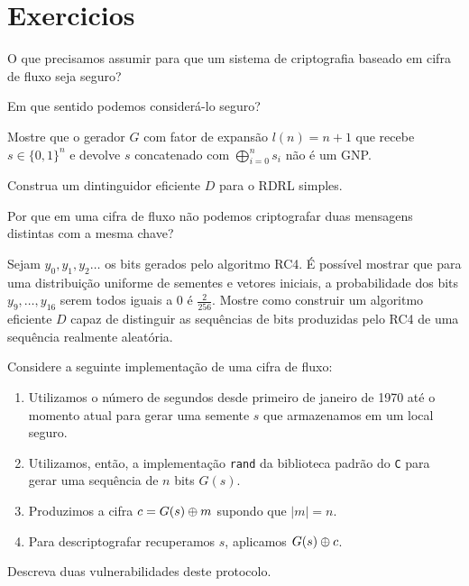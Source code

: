\section{Exercicios}
\label{sec:exercicios}

\begin{exercicio}
  O que precisamos assumir para que um sistema de criptografia baseado em cifra de fluxo seja seguro?

  Em que sentido podemos considerá-lo seguro?
\end{exercicio}

\begin{exercicio}
Mostre que o gerador $G$ com fator de expansão $l(n) = n + 1$ que recebe $s \in \{0,1\}^n$ e devolve $s$ concatenado com $\bigoplus_{i=0}^ns_i$ não é um GNP.  
\end{exercicio}

\begin{exercicio}
  Construa um dintinguidor eficiente $D$ para o RDRL simples.
\end{exercicio}

\begin{exercicio}
  Por que em uma cifra de fluxo não podemos criptografar duas mensagens distintas com a mesma chave?
\end{exercicio}

\begin{exercicio}
 Sejam $y_0, y_1, y_2 \dots$ os bits gerados pelo algoritmo RC4.
É possível mostrar que para uma distribuição uniforme de sementes e vetores iniciais, a probabilidade dos bits $y_9, \dots, y_{16}$ serem todos iguais a $0$ é $\frac{2}{256}$.
Mostre como construir um algoritmo eficiente $D$ capaz de distinguir as sequências de bits produzidas pelo RC4 de uma sequência realmente aleatória.
\end{exercicio}

\begin{exercicio}
  Considere a seguinte implementação de uma cifra de fluxo:
\begin{enumerate}
\item Utilizamos o número de segundos desde primeiro de janeiro de 1970 até o momento atual para gerar uma semente $s$ que armazenamos em um local seguro.
\item Utilizamos, então, a implementação {\tt rand} da biblioteca padrão do {\tt C} para gerar uma sequência de $n$ bits $G(s)$.
\item Produzimos a cifra $c = G(s) \oplus m$ supondo que $|m| = n$.
\item Para descriptografar recuperamos $s$, aplicamos $G(s) \oplus c$.
\end{enumerate}

  Descreva duas vulnerabilidades deste protocolo.
\end{exercicio}


